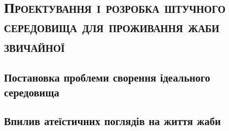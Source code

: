 
\newpage

\chapter{\textsc{Проектування\- і розробка\- штучного середовища для проживання жаби звичайної}}

\section{Постановка\- проблеми\- сворення ідеального середовища}

\section{Впилив атеїстичних поглядів на життя жаби}
